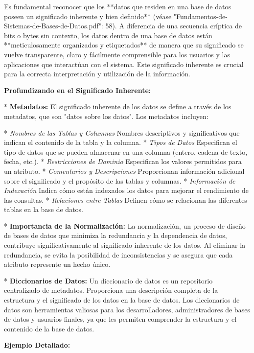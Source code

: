 Es fundamental reconocer que los **datos que residen en una base de datos poseen un significado inherente y bien definido** (véase "Fundamentos-de-Sistemas-de-Bases-de-Datos.pdf": 58). A diferencia de una secuencia críptica de bits o bytes sin contexto, los datos dentro de una base de datos están **meticulosamente organizados y etiquetados** de manera que su significado se vuelve transparente, claro y fácilmente comprensible para los usuarios y las aplicaciones que interactúan con el sistema.  Este significado inherente es crucial para la correcta interpretación y utilización de la información.

\textbf{Profundizando en el Significado Inherente:}

*   \textbf{Metadatos:} El significado inherente de los datos se define a través de los metadatos, que son "datos sobre los datos".  Los metadatos incluyen:

    *   \textit{Nombres de las Tablas y Columnas}  Nombres descriptivos y significativos que indican el contenido de la tabla y la columna.
    *   \textit{Tipos de Datos} Especifican el tipo de datos que se pueden almacenar en una columna (entero, cadena de texto, fecha, etc.).
    *   \textit{Restricciones de Dominio}  Especifican los valores permitidos para un atributo.
    *   \textit{Comentarios y Descripciones} Proporcionan información adicional sobre el significado y el propósito de las tablas y columnas.
    *   \textit{Información de Indexación}  Indica cómo están indexados los datos para mejorar el rendimiento de las consultas.
    *   \textit{Relaciones entre Tablas}  Definen cómo se relacionan las diferentes tablas en la base de datos.

*   \textbf{Importancia de la Normalización:} La normalización, un proceso de diseño de bases de datos que minimiza la redundancia y la dependencia de datos, contribuye significativamente al significado inherente de los datos.  Al eliminar la redundancia, se evita la posibilidad de inconsistencias y se asegura que cada atributo represente un hecho único.

*   \textbf{Diccionarios de Datos:}  Un diccionario de datos es un repositorio centralizado de metadatos.  Proporciona una descripción completa de la estructura y el significado de los datos en la base de datos.  Los diccionarios de datos son herramientas valiosas para los desarrolladores, administradores de bases de datos y usuarios finales, ya que les permiten comprender la estructura y el contenido de la base de datos.

\textbf{Ejemplo Detallado:}

